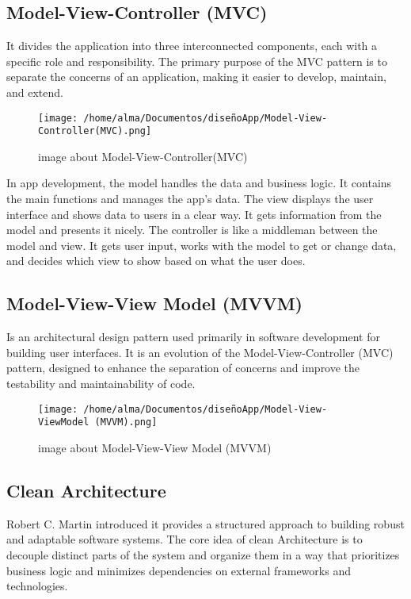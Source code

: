 \documentclass[12pt,a4paper]{article}
\begin{document}
\subsection{Model-View-Controller (MVC)}
\justify It divides the application into three interconnected components, each with a specific role and responsibility. The primary purpose of the MVC pattern is to separate the concerns of an application, making it easier to develop, maintain, and extend.
\begin{figure}[h]
    \centering
    \texttt{[image: /home/alma/Documentos/diseñoApp/Model-View-Controller(MVC).png]}
    \caption{image about Model-View-Controller(MVC)}
    \label{fig:etiqueta}
\end{figure}
\justify In app development, the model handles the data and business logic. It contains the main functions and manages the app's data. The view displays the user interface and shows data to users in a clear way. It gets information from the model and presents it nicely. The controller is like a middleman between the model and view. It gets user input, works with the model to get or change data, and decides which view to show based on what the user does.

\subsection{Model-View-View Model (MVVM)}
\justify Is an architectural design pattern used primarily in software development for building user interfaces. It is an evolution of the Model-View-Controller (MVC) pattern, designed to enhance the separation of concerns and improve the testability and maintainability of code.

\begin{figure}[h]
    \centering
    \texttt{[image: /home/alma/Documentos/diseñoApp/Model-View-ViewModel (MVVM).png]}
    \caption{image about Model-View-View Model (MVVM)}
    \label{fig:etiqueta}
\end{figure}

\subsection{Clean Architecture }
\justify Robert C. Martin introduced it provides a structured approach to building robust and adaptable software systems. The core idea of clean Architecture is to decouple distinct parts of the system and organize them in a way that prioritizes business logic and minimizes dependencies on external frameworks and technologies.
\end{document}

